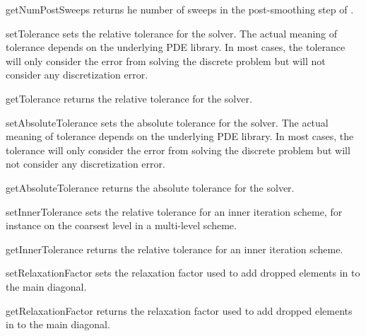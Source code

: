 \begin{methoddesc}[SolverOptions]{getNumPostSweeps}{}
returns he number of sweeps in the post-smoothing step of \AMG.
\end{methoddesc}

\begin{methoddesc}[SolverOptions]{setTolerance}{}
sets the relative tolerance for the solver. The actual meaning of tolerance
depends on the underlying PDE library. In most cases, the tolerance
will only consider the error from solving the discrete problem but will
not consider any discretization error.
\end{methoddesc}

\begin{methoddesc}[SolverOptions]{getTolerance}{}
returns the relative tolerance for the solver.
\end{methoddesc}

\begin{methoddesc}[SolverOptions]{setAbsoluteTolerance}{}
sets the absolute tolerance for the solver. The actual meaning of tolerance
depends on the underlying PDE library. In most cases, the tolerance
will only consider the error from solving the discrete problem but will
not consider any discretization error.
\end{methoddesc}

\begin{methoddesc}[SolverOptions]{getAbsoluteTolerance}{}
returns the absolute tolerance for the solver.
\end{methoddesc}

\begin{methoddesc}[SolverOptions]{setInnerTolerance}{}
sets the relative tolerance for an inner iteration scheme, for instance
on the coarsest level in a multi-level scheme.
\end{methoddesc}

\begin{methoddesc}[SolverOptions]{getInnerTolerance}{}
returns the relative tolerance for an inner iteration scheme.
\end{methoddesc}


\begin{methoddesc}[SolverOptions]{setRelaxationFactor}{}
sets the relaxation factor used to add dropped elements in \RILU to the main diagonal.
\end{methoddesc}

\begin{methoddesc}[SolverOptions]{getRelaxationFactor}{}
returns the relaxation factor used to add dropped elements in \RILU to the main diagonal.
\end{methoddesc}


